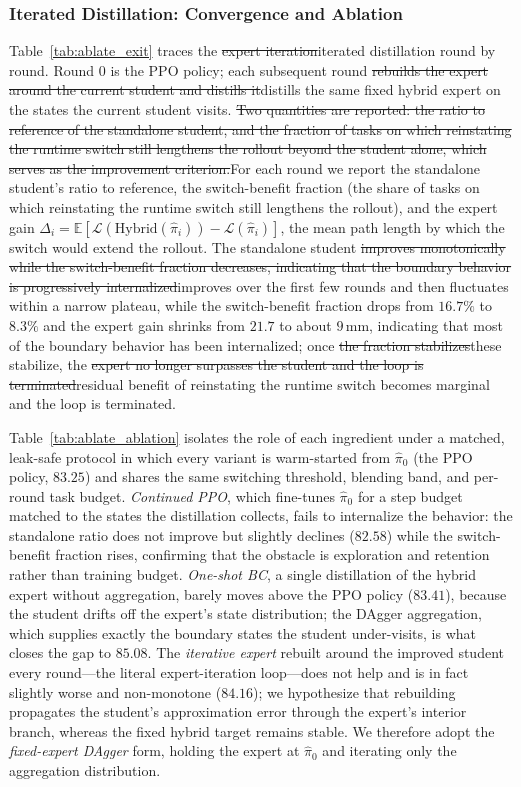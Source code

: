 \documentclass[journal, twoside]{IEEEtran}
\newcommand{\rev}[1]{\begingroup\color{magenta}#1\endgroup}
\newcommand{\rst}[1]{{\color{rstcolor}#1}}
\begin{document}
\rev{\subsubsection{Iterated Distillation: Convergence and Ablation}
Table~\ref{tab:ablate_exit} traces the \sout{expert iteration}\rst{iterated distillation} round by round. Round $0$ is the PPO policy; each subsequent round \sout{rebuilds the expert around the current student and distills it}\rst{distills the same fixed hybrid expert on the states the current student visits}. \sout{Two quantities are reported: the ratio to reference of the standalone student, and the fraction of tasks on which reinstating the runtime switch still lengthens the rollout beyond the student alone, which serves as the improvement criterion.}\rst{For each round we report the standalone student's ratio to reference, the switch-benefit fraction (the share of tasks on which reinstating the runtime switch still lengthens the rollout), and the expert gain $\Delta_i=\mathbb{E}\!\left[\mathcal{L}(\mathrm{Hybrid}(\hat{\pi}_i))-\mathcal{L}(\hat{\pi}_i)\right]$, the mean path length by which the switch would extend the rollout.} The standalone student \sout{improves monotonically while the switch-benefit fraction decreases, indicating that the boundary behavior is progressively internalized}\rst{improves over the first few rounds and then fluctuates within a narrow plateau, while the switch-benefit fraction drops from $16.7\%$ to $8.3\%$ and the expert gain shrinks from $21.7$ to about $9$\,mm, indicating that most of the boundary behavior has been internalized}; once \sout{the fraction stabilizes}\rst{these stabilize}, the \sout{expert no longer surpasses the student and the loop is terminated}\rst{residual benefit of reinstating the runtime switch becomes marginal and the loop is terminated}.}

\rev{Table~\ref{tab:ablate_ablation} isolates the role of each ingredient under a matched, leak-safe protocol in which every variant is warm-started from $\hat{\pi}_{0}$ (the PPO policy, $83.25$) and shares the same switching threshold, blending band, and per-round task budget. \emph{Continued PPO}, which fine-tunes $\hat{\pi}_{0}$ for a step budget matched to the states the distillation collects, fails to internalize the behavior: the standalone ratio does not improve but slightly declines ($82.58$) while the switch-benefit fraction rises, confirming that the obstacle is exploration and retention rather than training budget. \emph{One-shot BC}, a single distillation of the hybrid expert without aggregation, barely moves above the PPO policy ($83.41$), because the student drifts off the expert's state distribution; the DAgger aggregation, which supplies exactly the boundary states the student under-visits, is what closes the gap to $85.08$. The \emph{iterative expert} rebuilt around the improved student every round---the literal expert-iteration loop---does not help and is in fact slightly worse and non-monotone ($84.16$); we hypothesize that rebuilding propagates the student's approximation error through the expert's interior branch, whereas the fixed hybrid target remains stable. We therefore adopt the \emph{fixed-expert DAgger} form, holding the expert at $\hat{\pi}_{0}$ and iterating only the aggregation distribution.}
\end{document}
